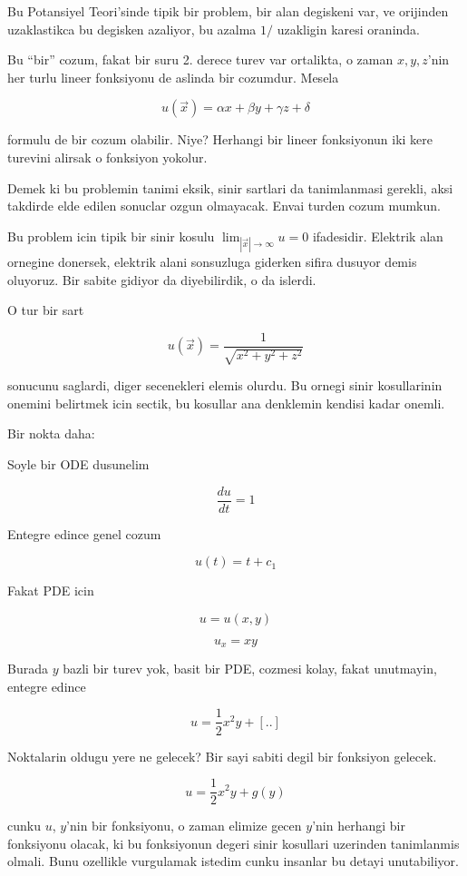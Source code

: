\documentclass[12pt,fleqn]{article}\usepackage{../common}
\begin{document}
Bu Potansiyel Teori'sinde tipik bir problem, bir alan degiskeni var, ve
orijinden uzaklastikca bu degisken azaliyor, bu azalma $1 / $ uzakligin
karesi oraninda. 

Bu ``bir'' cozum, fakat bir suru 2. derece turev var ortalikta, o zaman
$x,y,z$'nin her turlu lineer fonksiyonu de aslinda bir cozumdur. Mesela

\[ u(\vec{x}) = \alpha x + \beta y + \gamma z + \delta \]

formulu de bir cozum olabilir. Niye? Herhangi bir lineer fonksiyonun iki
kere turevini alirsak o fonksiyon yokolur. 

Demek ki bu problemin tanimi eksik, sinir sartlari da tanimlanmasi gerekli,
aksi takdirde elde edilen sonuclar ozgun olmayacak. Envai turden cozum
mumkun. 

Bu problem icin tipik bir sinir kosulu $\lim_{|\vec{x}|\to \infty} u = 0$
ifadesidir. Elektrik alan ornegine donersek, elektrik alani sonsuzluga
giderken sifira dusuyor demis oluyoruz. Bir sabite gidiyor da diyebilirdik,
o da islerdi. 

O tur bir sart 

\[ u(\vec{x}) = \frac{1}{\sqrt{x^2+y^2+z^2}} \]

sonucunu saglardi, diger secenekleri elemis olurdu. Bu ornegi sinir
kosullarinin onemini belirtmek icin sectik, bu kosullar ana denklemin
kendisi kadar onemli. 

Bir nokta daha:

Soyle bir ODE dusunelim

\[ \frac{du}{dt} = 1 \]

Entegre edince genel cozum

\[ u(t) = t + c_1 \]

Fakat PDE icin

\[ u = u(x,y) \]

\[ u_x = xy \]

Burada $y$ bazli bir turev yok, basit bir PDE, cozmesi kolay, fakat
unutmayin, entegre edince

\[ u = \frac{1}{2}x^2y + [..] \]

Noktalarin oldugu yere ne gelecek? Bir sayi sabiti degil bir fonksiyon
gelecek. 

\[ u = \frac{1}{2}x^2y + g(y) \]

cunku $u$, $y$'nin bir fonksiyonu, o zaman elimize gecen $y$'nin herhangi
bir fonksiyonu olacak, ki bu fonksiyonun degeri sinir kosullari uzerinden
tanimlanmis olmali. Bunu ozellikle vurgulamak istedim cunku insanlar bu
detayi unutabiliyor.
\end{document}
